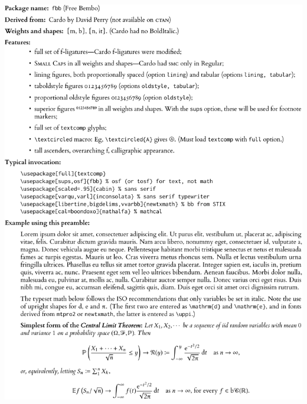 \documentclass{article}
\begin{document}
\newpage
\hypertarget{lnk:fbb}{}
\includegraphics{fbbsamp-crop}
\newpage
\hypertarget{lnk:garamondx}{}
\end{document}
